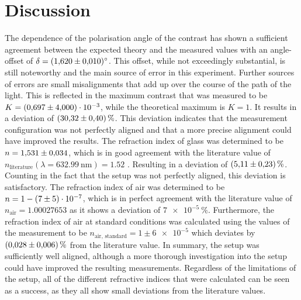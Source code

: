 \section{Discussion}
\label{sec:Discussion}

The dependence of the polarisation angle of the contrast has shown a sufficient agreement between the expected theory and the measured values with an angle-offset of $\delta=\SI{1.620\pm 0.010}{\degree}$.
This offset, while not exceedingly substantial, is still noteworthy and the main source of error in this experiment.
Further sources of errors are small misalignments that add up over the course of the path of the light.
This is reflected in the maximum contrast that was measured to be $K= \SI{0.697\pm 4e-3}{}$, while the theoretical maximum is $K=1$.
It results in a deviation of $\SI{30.32\pm0.4}{\percent}$. 
This deviation indicates that the measurement configuration was not perfectly aligned and that a more precise alignment could have improved the results. \newline
The refraction index of glass was determined to be $n=\num{1.531 \pm 0.034}$, which is in good agreement with the literature value of $n_{\text{literature}}(\lambda=\SI{632.99}{\nano\meter})=\num{1.52}$ \cite{RefractiveIndex}.
Resulting in a deviation of $\SI{5.11 (2.3)}{\percent}$.
Counting in the fact that the setup was not perfectly aligned, this deviation is satisfactory.
The refraction index of air was determined to be $n=1-\num{7 \pm 5 e-7}$, which is in perfect agreement with the literature value of $n_{\text{air}}=\num{1.00027653}$ \cite{RefractiveIndex} as it shows a deviation of $\SI{7e-5}{\percent}$.
Furthermore, the refraction index of air at standard conditions was calculated using the values of the measurement to be $n_{\text{air, standard}}=1\pm\num{6e-5}$ which deviates by $\SI{0.028 (0.006)}{\percent}$ from the literature value. \newline
In summary, the setup was sufficiently well aligned, although a more thorough investigation into the setup could have improved the resulting measurements.
Regardless of the limitations of the setup, all of the different refractive indices that were calculated can be seen as a success, as they all show small deviations from the literature values.